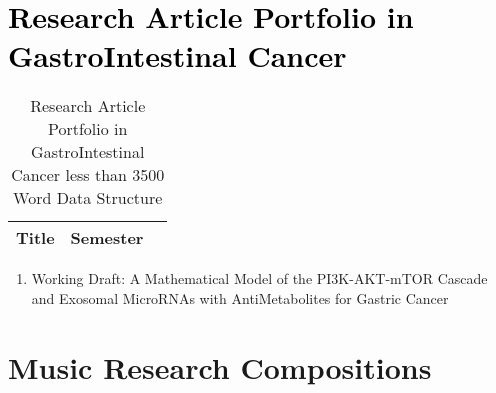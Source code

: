 \documentclass{TMLSStyleGuideResumeVitae}
\begin{document}

\section{\textcolor{black}{Research Article Portfolio in GastroIntestinal Cancer}}

\begin{table}[H]\footnotesize
\caption{Research Article Portfolio in GastroIntestinal Cancer less than 3500 Word Data Structure}	
\begin{tabular}{p{7cm}p{1cm}p{0.25cm}}
\hline
Title & Semester & \\   
\hline
\hline
\end{tabular}
\end{table}

\begin{enumerate}
\item Working Draft: A Mathematical Model of the PI3K-AKT-mTOR Cascade and 
Exosomal MicroRNAs with AntiMetabolites for Gastric Cancer
\end{enumerate}
\section{Music Research Compositions}
\end{document}
